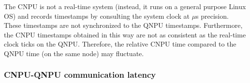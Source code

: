 The \ac{CNPU} is not a real-time system (instead, it runs on a general purpose Linux \ac{OS}) and records timestamps by consulting the system clock at $\mu$s precision. These timestamps are not synchronized to the \ac{QNPU} timestamps. Furthermore, the \ac{CNPU} timestamps obtained in this way are not as consistent as the real-time clock ticks on the \ac{QNPU}. Therefore, the relative \ac{CNPU} time compared to the \ac{QNPU} time (on the same node) may fluctuate.




\subsubsection{CNPU-QNPU communication latency}
\label{sec:cnpu-qnpu-latency-estimation}

